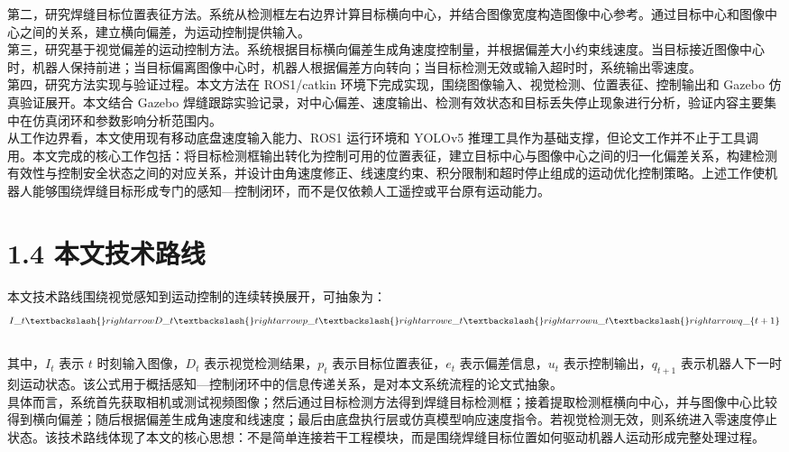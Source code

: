 \documentclass[UTF8,a4paper,12pt]{ctexrep}
\begin{document}
第二，研究焊缝目标位置表征方法。系统从检测框左右边界计算目标横向中心，并结合图像宽度构造图像中心参考。通过目标中心和图像中心之间的关系，建立横向偏差，为运动控制提供输入。\\

第三，研究基于视觉偏差的运动控制方法。系统根据目标横向偏差生成角速度控制量，并根据偏差大小约束线速度。当目标接近图像中心时，机器人保持前进；当目标偏离图像中心时，机器人根据偏差方向转向；当目标检测无效或输入超时时，系统输出零速度。\\

第四，研究方法实现与验证过程。本文方法在 ROS1/catkin 环境下完成实现，围绕图像输入、视觉检测、位置表征、控制输出和 Gazebo 仿真验证展开。本文结合 Gazebo 焊缝跟踪实验记录，对中心偏差、速度输出、检测有效状态和目标丢失停止现象进行分析，验证内容主要集中在仿真闭环和参数影响分析范围内。\\

从工作边界看，本文使用现有移动底盘速度输入能力、ROS1 运行环境和 YOLOv5 推理工具作为基础支撑，但论文工作并不止于工具调用。本文完成的核心工作包括：将目标检测框输出转化为控制可用的位置表征，建立目标中心与图像中心之间的归一化偏差关系，构建检测有效性与控制安全状态之间的对应关系，并设计由角速度修正、线速度约束、积分限制和超时停止组成的运动优化控制策略。上述工作使机器人能够围绕焊缝目标形成专门的感知—控制闭环，而不是仅依赖人工遥控或平台原有运动能力。\\

\section{1.4 本文技术路线}

本文技术路线围绕视觉感知到运动控制的连续转换展开，可抽象为：\\

$$\\
I\_t \textbackslash\{\}rightarrow D\_t \textbackslash\{\}rightarrow p\_t \textbackslash\{\}rightarrow e\_t \textbackslash\{\}rightarrow u\_t \textbackslash\{\}rightarrow q\_\{t+1\}\\
$$\\

其中，$I_t$ 表示 $t$ 时刻输入图像，$D_t$ 表示视觉检测结果，$p_t$ 表示目标位置表征，$e_t$ 表示偏差信息，$u_t$ 表示控制输出，$q_{t+1}$ 表示机器人下一时刻运动状态。该公式用于概括感知—控制闭环中的信息传递关系，是对本文系统流程的论文式抽象。\\

具体而言，系统首先获取相机或测试视频图像；然后通过目标检测方法得到焊缝目标检测框；接着提取检测框横向中心，并与图像中心比较得到横向偏差；随后根据偏差生成角速度和线速度；最后由底盘执行层或仿真模型响应速度指令。若视觉检测无效，则系统进入零速度停止状态。该技术路线体现了本文的核心思想：不是简单连接若干工程模块，而是围绕焊缝目标位置如何驱动机器人运动形成完整处理过程。\\
\end{document}
